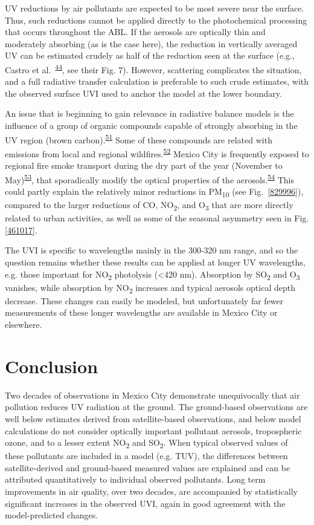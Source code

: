 \documentclass[10pt]{article}
\begin{document}
UV reductions by air pollutants are expected to be most severe near the
surface. Thus, such reductions cannot be applied directly to the
photochemical processing that occurs throughout the ABL. If the aerosols
are optically thin and moderately absorbing (as is the case here), the
reduction in vertically averaged UV can be estimated crudely as half of
the reduction seen at the surface (e.g., Castro et
al.~\textsuperscript{\hyperref[csl:44]{44}}, see their Fig. 7). However, scattering
complicates the situation, and a full radiative transfer calculation is
preferable to such crude estimates, with the observed surface UVI used
to anchor the model at the lower boundary.

An issue that is beginning to gain relevance in radiative balance models
is the influence of a group of organic compounds capable of strongly
absorbing in the UV region (brown carbon).\textsuperscript{\hyperref[csl:51]{51}} Some of
these compounds are related with emissions from local and regional
wildfires.\textsuperscript{\hyperref[csl:52]{52}} Mexico City is frequently exposed to
regional fire smoke transport during the dry part of the year (November
to May)\textsuperscript{\hyperref[csl:53]{53}}, that sporadically modify the optical
properties of the aerosols.\textsuperscript{\hyperref[csl:54]{54}} This could partly explain
the relatively minor reductions in PM\textsubscript{10} (see
Fig.~{\ref{829996}}), compared to the larger reductions
of CO, NO\textsubscript{2}, and O\textsubscript{3} that are more
directly related to urban activities, as well as some of the seasonal
asymmetry seen in Fig. {\ref{461017}}. ~

The UVI is specific to wavelengths mainly in the 300-320 nm range, and
so the question remains whether these results can be applied at longer
UV wavelengths, e.g. those important for NO\textsubscript{2} photolysis
(\textless{}420 nm). Absorption by SO\textsubscript{2} and
O\textsubscript{3} vanishes, while absorption by NO\textsubscript{2}
increases and typical aerosols optical depth decrease. These changes can
easily be modeled, but unfortunately far fewer measurements of these
longer wavelengths are available in Mexico City or elsewhere.

\section*{Conclusion}\label{conclusion}

Two decades of observations in Mexico City demonstrate unequivocally
that air pollution reduces UV radiation at the ground. The ground-based
observations are well below estimates derived from satellite-based
observations, and below model calculations do not consider optically
important pollutant aerosols, tropospheric ozone, and to a lesser extent
NO\textsubscript{2} and SO\textsubscript{2}. When typical observed
values of these pollutants are included in a model (e.g. TUV), the
differences between satellite-derived and ground-based measured values
are explained and can be attributed quantitatively to individual
observed pollutants. Long term improvements in air quality, over two
decades, are accompanied by statistically significant increases in the
observed UVI, again in good agreement with the model-predicted changes.
~
\end{document}

